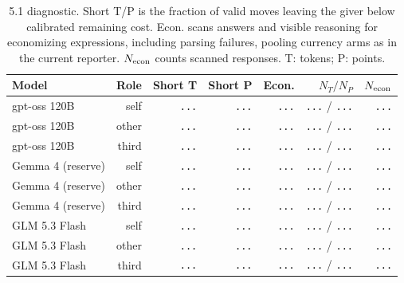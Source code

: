 \begin{table}[H]
\centering\footnotesize
\setlength{\tabcolsep}{4pt}
\caption{5.1 diagnostic. Short T/P is the fraction of valid moves leaving the giver below calibrated remaining cost. Econ. scans answers and visible reasoning for economizing expressions, including parsing failures, pooling currency arms as in the current reporter. $N_{\rm econ}$ counts scanned responses. T: tokens; P: points.}
\label{tab:motive-diagnostics}
\begin{tabular}{@{}lrrrrrr@{}}
\toprule
Model & Role & Short T & Short P & Econ. & $N_T/N_P$ & $N_{\rm econ}$ \\
\midrule
gpt-oss 120B & self & {\color{gray}\texttt{...}} & {\color{gray}\texttt{...}} & {\color{gray}\texttt{...}} & {\color{gray}\texttt{...}} / {\color{gray}\texttt{...}} & {\color{gray}\texttt{...}} \\
gpt-oss 120B & other & {\color{gray}\texttt{...}} & {\color{gray}\texttt{...}} & {\color{gray}\texttt{...}} & {\color{gray}\texttt{...}} / {\color{gray}\texttt{...}} & {\color{gray}\texttt{...}} \\
gpt-oss 120B & third & {\color{gray}\texttt{...}} & {\color{gray}\texttt{...}} & {\color{gray}\texttt{...}} & {\color{gray}\texttt{...}} / {\color{gray}\texttt{...}} & {\color{gray}\texttt{...}} \\
Gemma 4 (reserve) & self & {\color{gray}\texttt{...}} & {\color{gray}\texttt{...}} & {\color{gray}\texttt{...}} & {\color{gray}\texttt{...}} / {\color{gray}\texttt{...}} & {\color{gray}\texttt{...}} \\
Gemma 4 (reserve) & other & {\color{gray}\texttt{...}} & {\color{gray}\texttt{...}} & {\color{gray}\texttt{...}} & {\color{gray}\texttt{...}} / {\color{gray}\texttt{...}} & {\color{gray}\texttt{...}} \\
Gemma 4 (reserve) & third & {\color{gray}\texttt{...}} & {\color{gray}\texttt{...}} & {\color{gray}\texttt{...}} & {\color{gray}\texttt{...}} / {\color{gray}\texttt{...}} & {\color{gray}\texttt{...}} \\
GLM 5.3 Flash & self & {\color{gray}\texttt{...}} & {\color{gray}\texttt{...}} & {\color{gray}\texttt{...}} & {\color{gray}\texttt{...}} / {\color{gray}\texttt{...}} & {\color{gray}\texttt{...}} \\
GLM 5.3 Flash & other & {\color{gray}\texttt{...}} & {\color{gray}\texttt{...}} & {\color{gray}\texttt{...}} & {\color{gray}\texttt{...}} / {\color{gray}\texttt{...}} & {\color{gray}\texttt{...}} \\
GLM 5.3 Flash & third & {\color{gray}\texttt{...}} & {\color{gray}\texttt{...}} & {\color{gray}\texttt{...}} & {\color{gray}\texttt{...}} / {\color{gray}\texttt{...}} & {\color{gray}\texttt{...}} \\
\bottomrule
\end{tabular}
\end{table}
